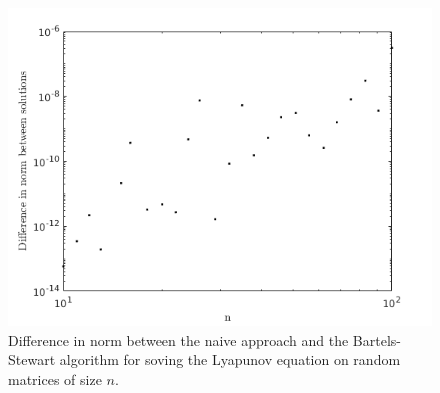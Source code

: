 \begin{figure}[h!]
\centering
\includegraphics[scale=0.5]{norm.png}
\caption{Difference in norm between the naive approach and the Bartels-Stewart algorithm for soving the Lyapunov equation on random matrices of size $n$.}
\label{task1}
\end{figure}


